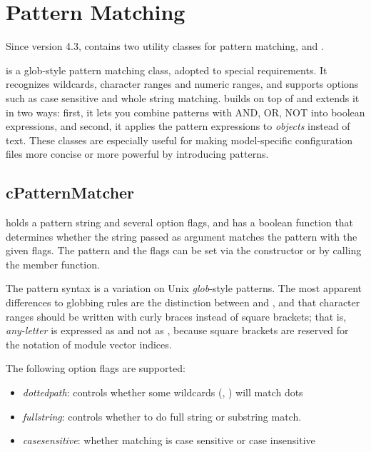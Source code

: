 \section{Pattern Matching}
\label{sec:sim-lib:pattern-matching}

Since version 4.3, {\opp} contains two utility classes for pattern
matching,  and .

 is a glob-style pattern matching class, adopted to
special {\opp} requirements. It recognizes wildcards, character ranges and
numeric ranges, and supports options such as case sensitive and whole
string matching.  builds on top of
 and extends it in two ways: first, it lets you
combine patterns with AND, OR, NOT into boolean expressions, and second, it
applies the pattern expressions to \textit{objects} instead of text. These
classes are especially useful for making model-specific configuration files
more concise or more powerful by introducing patterns.



\subsection{cPatternMatcher}
\label{sec:sim-lib:cpatternmatcher}

 holds a pattern string and several option flags,
and has a  boolean function that determines whether the
string passed as argument matches the pattern with the given flags. The
pattern and the flags can be set via the constructor or by calling the
 member function.

The pattern syntax is a variation on Unix \textit{glob}-style patterns. The
most apparent differences to globbing rules are the distinction between
\ttt{*} and \ttt{**}, and that character ranges should be written with
curly braces instead of square brackets; that is, \textit{any-letter} is
expressed as  and not as \ttt{[a-zA-Z]}, because square
brackets are reserved for the notation of module vector indices.

The following option flags are supported:

\begin{itemize}
  \item \textit{dottedpath}: controls whether some wildcards (, \ttt{*}) will match dots
  \item \textit{fullstring}: controls whether to do full string or substring match.
  \item \textit{casesensitive}: whether matching is case sensitive or case insensitive
\end{itemize}

